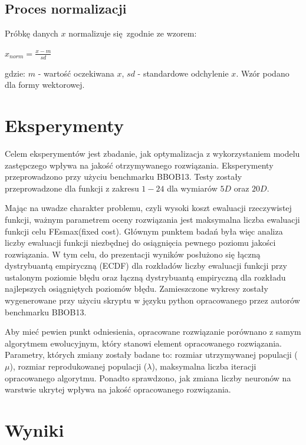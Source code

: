 \documentclass[runningheads]{llncs}
\begin{document}
\subsection{Proces normalizacji}
Próbkę danych $x$ normalizuje się zgodnie ze wzorem:

$x_{norm}=\frac{x - m}{sd}$

gdzie:	$m$ - wartość oczekiwana $x$, $sd$ - standardowe odchylenie $x$.
Wzór podano dla formy wektorowej.

\section{Eksperymenty}
Celem eksperymentów jest zbadanie, jak optymalizacja z wykorzystaniem modelu 
zastępczego wpływa na jakość otrzymywanego rozwiązania. Eksperymenty 
przeprowadzono przy użyciu benchmarku BBOB13. Testy zostały przeprowadzone dla 
funkcji z zakresu $1-24$ dla wymiarów $5D$ oraz $20D$. 

Mając na uwadze charakter problemu, czyli wysoki koszt ewaluacji rzeczywistej 
funkcji, ważnym parametrem oceny rozwiązania jest maksymalna liczba ewaluacji 
funkcji celu FEsmax(fixed cost). Głównym punktem badań była więc analiza liczby 
ewaluacji funkcji niezbędnej do osiągnięcia pewnego poziomu jakości 
rozwiązania. W tym celu, do prezentacji wyników posłużono się łączną 
dystrybuantą empiryczną (ECDF) dla rozkładów liczby ewaluacji funkcji przy 
ustalonym poziomie błędu oraz łączną dystrybuantą empiryczną dla rozkładu 
najlepszych osiągniętych poziomów błędu. Zamieszczone wykresy zostały 
wygenerowane przy użyciu skryptu w języku python opracowanego przez autorów 
benchmarku BBOB13.

Aby mieć pewien punkt odniesienia, opracowane rozwiązanie porównano z 
samym algorytmem ewolucyjnym, który stanowi element opracowanego rozwiązania. 
Parametry, których zmiany zostały badane to: rozmiar utrzymywanej populacji 
($\mu$), rozmiar reprodukowanej populacji ($\lambda$), maksymalna liczba 
iteracji opracowanego algorytmu. Ponadto sprawdzono, jak zmiana liczby 
neuronów na warstwie ukrytej wpływa na jakość opracowanego rozwiązania.

\section{Wyniki}
\newcommand{\rot}[2][2.5]{
  \hspace*{-3.5\baselineskip}%
  \begin{rotate}{90}\hspace{#1em}#2
\end{rotate}}
  
\end{document}
